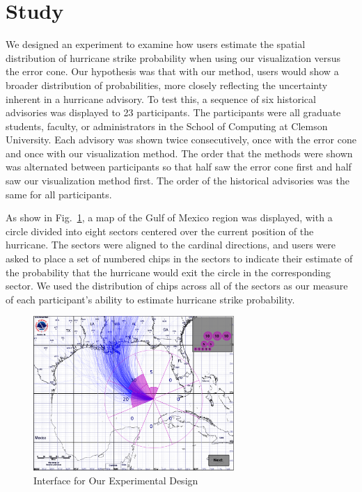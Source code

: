 \documentclass[journal]{vgtc}                %
\begin{document}

\section{Study}
We designed an experiment to examine how users estimate the spatial distribution of  hurricane strike probability when using our visualization versus the error cone.
Our hypothesis was that with our method, users would show a broader distribution of probabilities, more closely reflecting the uncertainty inherent in a hurricane advisory. To test this, a sequence of six historical advisories was displayed to 23 participants. The participants were all graduate students, faculty, or administrators in the School of Computing at Clemson University.  Each advisory was shown twice consecutively, once with the error cone and once with our visualization method. The order that the methods were shown was alternated between participants so that half saw the error cone first and half saw our visualization method first.  The order of the historical advisories was the same for all participants.

As show in Fig.~\ref{fig:exp}, a map of the Gulf of Mexico region was displayed, with a circle divided into eight sectors centered over the current position of the hurricane.  The sectors were aligned to the cardinal directions, and users were asked to place a set of numbered chips in the sectors to indicate their estimate of the probability that the hurricane would exit the circle in the corresponding sector. We used the distribution of  chips across all of the sectors as our measure of each participant's ability to estimate hurricane strike probability.

\begin{figure}[htb]
  \centering
  \includegraphics[width=3.0in]{figures/exp.eps}
  \caption{Interface for Our Experimental Design}
  \label{fig:exp}
\end{figure}
\end{document}
